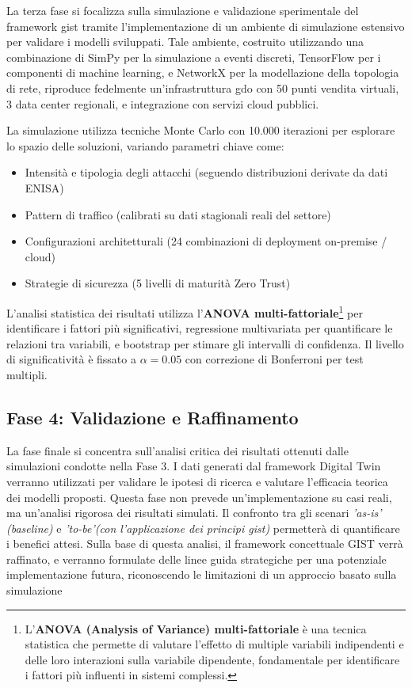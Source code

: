 \label{ssec:fase3}
La terza fase si focalizza sulla simulazione e validazione sperimentale del framework \gls{gist} tramite l'implementazione di un ambiente di simulazione estensivo per validare i modelli sviluppati. Tale ambiente, costruito utilizzando una combinazione di SimPy per la simulazione a eventi discreti, TensorFlow per i componenti di machine learning, e NetworkX per la modellazione della topologia di rete, riproduce fedelmente un'infrastruttura \gls{gdo} con 50 punti vendita virtuali, 3 data center regionali, e integrazione con servizi cloud pubblici.

La simulazione utilizza tecniche Monte Carlo con 10.000 iterazioni per esplorare lo spazio delle soluzioni, variando parametri chiave come:
\begin{itemize}
    \item Intensità e tipologia degli attacchi (seguendo distribuzioni derivate da dati ENISA)
    \item Pattern di traffico (calibrati su dati stagionali reali del settore)
    \item Configurazioni architetturali (24 combinazioni di deployment on-premise / cloud)
    \item Strategie di sicurezza (5 livelli di maturità Zero Trust)
\end{itemize}
L'analisi statistica dei risultati utilizza l'\textbf{ANOVA multi-fattoriale}\footnote{L'\textbf{ANOVA (Analysis of Variance) multi-fattoriale} è una tecnica statistica che permette di valutare l'effetto di multiple variabili indipendenti e delle loro interazioni sulla variabile dipendente, fondamentale per identificare i fattori più influenti in sistemi complessi.} per identificare i fattori più significativi, regressione multivariata per quantificare le relazioni tra variabili, e bootstrap per stimare gli intervalli di confidenza. Il livello di significatività è fissato a $\alpha = 0.05$ con correzione di Bonferroni per test multipli.

\subsection{Fase 4: Validazione e Raffinamento}

\label{ssec:fase4}
La fase finale si concentra sull'analisi critica dei risultati ottenuti dalle simulazioni condotte nella Fase 3. I dati generati dal framework Digital Twin verranno utilizzati per validare le ipotesi di ricerca e valutare l'efficacia teorica dei modelli proposti. Questa fase non prevede un'implementazione su casi reali, ma un'analisi rigorosa dei risultati simulati. Il confronto tra gli scenari \emph{'as-is' (baseline)} e \emph{'to-be'(con l'applicazione dei principi \gls{gist})} permetterà di quantificare i benefici attesi. Sulla base di questa analisi, il framework concettuale GIST verrà raffinato, e verranno formulate delle linee guida strategiche per una potenziale implementazione futura, riconoscendo le limitazioni di un approccio basato sulla simulazione


